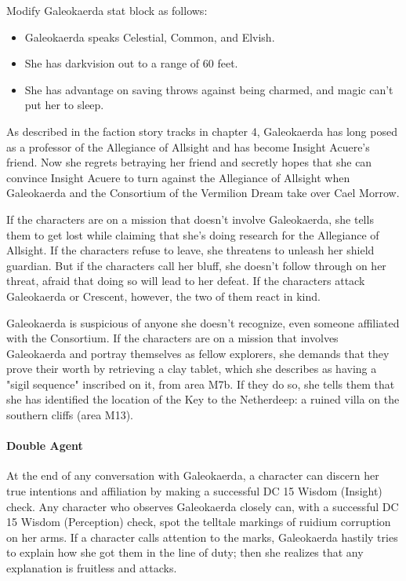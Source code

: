 \documentclass[10pt,a4paper,twoside,bg=print,twocolumn,openany,nodeprecatedcode]{dndbook}
\begin{document}
Modify Galeokaerda stat block as follows:


\begin{itemize}
\item Galeokaerda speaks Celestial, Common, and Elvish.
\item She has darkvision out to a range of 60 feet.
\item She has advantage on saving throws against being charmed, and magic can't put her to sleep.
\end{itemize}

As described in the faction story tracks in chapter 4, Galeokaerda has long posed as a professor of the Allegiance of Allsight and has become Insight Acuere's friend. Now she regrets betraying her friend and secretly hopes that she can convince Insight Acuere to turn against the Allegiance of Allsight when Galeokaerda and the Consortium of the Vermilion Dream take over Cael Morrow.


If the characters are on a mission that doesn't involve Galeokaerda, she tells them to get lost while claiming that she's doing research for the Allegiance of Allsight. If the characters refuse to leave, she threatens to unleash her shield guardian. But if the characters call her bluff, she doesn't follow through on her threat, afraid that doing so will lead to her defeat. If the characters attack Galeokaerda or Crescent, however, the two of them react in kind.

Galeokaerda is suspicious of anyone she doesn't recognize, even someone affiliated with the Consortium. If the characters are on a mission that involves Galeokaerda and portray themselves as fellow explorers, she demands that they prove their worth by retrieving a clay tablet, which she describes as having a "sigil sequence" inscribed on it, from area M7b. If they do so, she tells them that she has identified the location of the Key to the Netherdeep: a ruined villa on the southern cliffs (area M13).

\paragraph{Double Agent}
At the end of any conversation with Galeokaerda, a character can discern her true intentions and affiliation by making a successful DC 15 Wisdom (Insight) check. Any character who observes Galeokaerda closely can, with a successful DC 15 Wisdom (Perception) check, spot the telltale markings of ruidium corruption on her arms. If a character calls attention to the marks, Galeokaerda hastily tries to explain how she got them in the line of duty; then she realizes that any explanation is fruitless and attacks.
\end{document}

